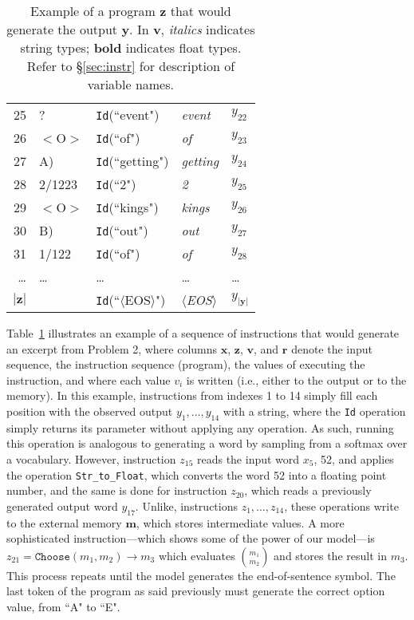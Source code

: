 \begin{table}[t]
\begin{tabular}{@{}r|l|l|l|l@{}}
25 & ? & {\tt Id}(``event") & \emph{event} & $y_{22}$ \\
26 & $<$O$>$ & {\tt Id}(``of") & \emph{of} & $y_{23}$ \\
27 & A) & {\tt Id}(``getting") & \emph{getting} & $y_{24}$ \\
28 & 2/1223 & {\tt Id}(``2") & \emph{2} & $y_{25}$ \\
29 & $<$O$>$ & {\tt Id}(``kings") & \emph{kings} & $y_{26}$ \\
30 & B) & {\tt Id}(``out") & \emph{out} & $y_{27}$ \\
31 & 1/122 & {\tt Id}(``of") & \emph{of} & $y_{28}$\\
\ldots & \ldots & \ldots & \ldots & \ldots \\
$|\boldsymbol{z}|$& & {\tt Id}(``$\langle$EOS$\rangle$") & $\langle$\emph{EOS}$\rangle$ & $y_{|\boldsymbol{y}|}$ \\
\bottomrule
\end{tabular}
\caption{Example of a program $\boldsymbol{z}$ that would generate the output $\boldsymbol{y}$. In $\boldsymbol{v}$, \emph{italics} indicates string types; $\boldsymbol{bold}$ indicates float types. Refer to \S\ref{sec:instr} for description of variable names.\label{tab:code_example}}
\end{table}

Table~\ref{tab:code_example} illustrates an example of a sequence of instructions that would generate an excerpt from Problem 2, where columns $\boldsymbol{x}$, $\boldsymbol{z}$, $\boldsymbol{v}$, and $\boldsymbol{r}$ denote the input sequence, the instruction sequence (program), the values of executing the instruction, and where each value $v_i$ is written (i.e., either to the output or to the memory). In this example, instructions from indexes 1 to 14 simply fill each position with the observed output $y_1,\ldots,y_{14}$ with a string, where the \texttt{Id} operation simply returns its parameter without applying any operation. As such, running this operation is analogous to generating a word by sampling from a softmax over a vocabulary. However, instruction $z_{15}$ reads the input word $x_5$, 52, and applies the operation \texttt{Str\_to\_Float}, which converts the word 52 into a floating point number, and the same is done for instruction $z_{20}$, which reads a previously generated output word $y_{17}$. Unlike, instructions $z_{1},\ldots,z_{14}$, these operations write to the external memory $\boldsymbol{m}$, which stores intermediate values. 
A more sophisticated instruction---which shows some of the power of our model---is $z_{21}=\texttt{Choose}(m_1, m_2) \rightarrow m_3$ which evaluates ${m_1 \choose m_2}$ and
stores the result in $m_3$. 
This process repeats until the model generates the end-of-sentence symbol. The last token of the program as said previously must generate the correct option value, from ``A" to ``E".

